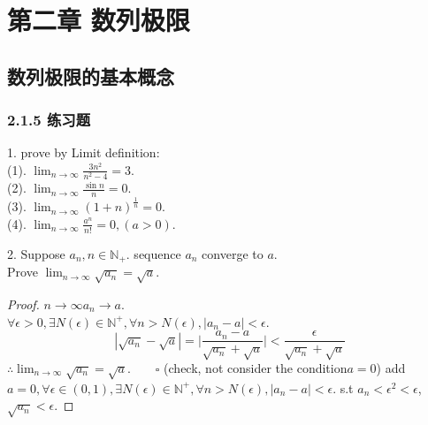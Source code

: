 \chapter{第二章 数列极限}
\section{数列极限的基本概念}
\subsection{2.1.5 练习题}
\date{2021.5.5}
\begin{qs}
1. prove by Limit definition:\\
(1). $ \lim_{n\rightarrow\infty}\frac{3n^2}{n^2-4} = 3 $.\\
(2). $ \lim_{n\rightarrow\infty}\frac{\sin n}{n} = 0 $.\\
(3). $ \lim_{n\rightarrow\infty}(1+n)^\frac{1}{n} = 0 $.\\
(4). $ \lim_{n\rightarrow\infty}\frac{a^n}{n!} = 0, (a>0) $.\\
\end{qs}

\begin{qs}
2. Suppose $ a_n, n\in\mathbb{N}_+ $. sequence {$ a_n $} converge to $ a $.\\ Prove $ \lim_{n\rightarrow\infty}\sqrt{a_n} = \sqrt{a} $.

\end{qs}
\begin{proof}
$ n\rightarrow\infty  a_n \rightarrow a $.\\
$ \forall \epsilon >0, \exists N(\epsilon) \in \mathbb{N}^+, \forall n>N(\epsilon), |a_n - a|<\epsilon $.
\begin{equation*}
	|\sqrt{a_n}-\sqrt{a}| = \Big|\frac{a_n-a}{\sqrt{a_n}+\sqrt{a}}\Big| < \frac{\epsilon}{\sqrt{a_n}+\sqrt{a}}
\end{equation*}
$ \therefore \lim_{n\rightarrow\infty}\sqrt{a_n} = \sqrt{a}. \qquad\square  $
(check, not consider the condition$ a=0 $)
add $ a=0, \forall \epsilon \in (0,1), \exists N(\epsilon) \in \mathbb{N}^+, \forall n>N(\epsilon), |a_n - a|<\epsilon $. s.t $ a_n<\epsilon^2 <\epsilon $, $ \sqrt{a_n} < \epsilon $.
\end{proof}

